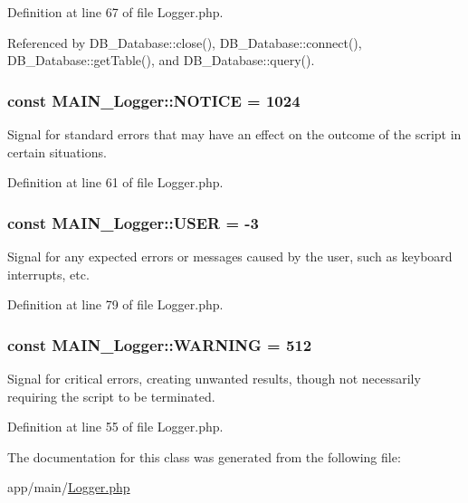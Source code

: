 Definition at line 67 of file Logger.php.

Referenced by DB\_\-Database::close(), DB\_\-Database::connect(), DB\_\-Database::getTable(), and DB\_\-Database::query().\hypertarget{classMAIN__Logger_a104a24882667b4b8f4452abb03c8266c}{
\subsubsection[{NOTICE}]{\setlength{\rightskip}{0pt plus 5cm}const {\bf MAIN\_\-Logger::NOTICE} = 1024}}
\label{d3/dff/classMAIN__Logger_a104a24882667b4b8f4452abb03c8266c}
Signal for standard errors that may have an effect on the outcome of the script in certain situations. 

Definition at line 61 of file Logger.php.\hypertarget{classMAIN__Logger_a75824ecd65029652b81460f69b83b779}{
\subsubsection[{USER}]{\setlength{\rightskip}{0pt plus 5cm}const {\bf MAIN\_\-Logger::USER} = -\/3}}
\label{d3/dff/classMAIN__Logger_a75824ecd65029652b81460f69b83b779}
Signal for any expected errors or messages caused by the user, such as keyboard interrupts, etc. 

Definition at line 79 of file Logger.php.\hypertarget{classMAIN__Logger_a9d79bb27ec1dfe5b64f8a78f2f6ceb9b}{
\subsubsection[{WARNING}]{\setlength{\rightskip}{0pt plus 5cm}const {\bf MAIN\_\-Logger::WARNING} = 512}}
\label{d3/dff/classMAIN__Logger_a9d79bb27ec1dfe5b64f8a78f2f6ceb9b}
Signal for critical errors, creating unwanted results, though not necessarily requiring the script to be terminated. 

Definition at line 55 of file Logger.php.

The documentation for this class was generated from the following file:\begin{DoxyCompactItemize}
\item 
app/main/\hyperlink{Logger_8php}{Logger.php}\end{DoxyCompactItemize}
